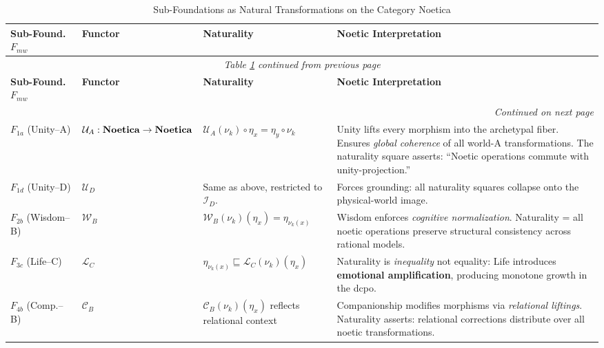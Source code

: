 \renewcommand{\arraystretch}{1.35}
\begin{longtable}{p{2cm}|p{2cm}|p{2.5cm}|p{4.5cm}}
\caption{Sub-Foundations as Natural Transformations on the Category Noetica}
\label{tab:subfoundation-natural-transformations} \\
\toprule
\textbf{Sub-Found.\ $F_{mw}$}
& \textbf{Functor}
& \textbf{Naturality}
& \textbf{Noetic Interpretation}
\\
\midrule
\endfirsthead
\multicolumn{4}{c}{\textit{Table \ref{tab:subfoundation-natural-transformations} continued from previous page}} \\
\toprule
\textbf{Sub-Found.\ $F_{mw}$}
& \textbf{Functor}
& \textbf{Naturality}
& \textbf{Noetic Interpretation}
\\
\midrule
\endhead
\midrule
\multicolumn{4}{r}{\textit{Continued on next page}} \\
\endfoot
\bottomrule
\endlastfoot

$F_{1a}$ (Unity--A)
& $\mathcal{U}_A : \mathbf{Noetica} \to \mathbf{Noetica}$
& $\mathcal{U}_A(\nu_k) \circ \eta_x = \eta_y \circ \nu_k$
& Unity lifts every morphism into the archetypal fiber.
  Ensures \emph{global coherence} of all world-A transformations.
  The naturality square asserts:
  ``Noetic operations commute with unity-projection.'' \\

$F_{1d}$ (Unity--D)
& $\mathcal{U}_D$
& Same as above, restricted to $\mathcal{I}_D$.
& Forces grounding: all naturality squares collapse onto the physical-world image.
\\

\midrule

$F_{2b}$ (Wisdom--B)
& $\mathcal{W}_B$
& $\mathcal{W}_B(\nu_k)(\eta_x) = \eta_{\nu_k(x)}$
& Wisdom enforces \emph{cognitive normalization}.
  Naturality = all noetic operations preserve structural consistency across rational models.
\\

\midrule

$F_{3c}$ (Life--C)
& $\mathcal{L}_C$
& $\eta_{\nu_k(x)} \sqsubseteq \mathcal{L}_C(\nu_k)(\eta_x)$
& Naturality is \emph{inequality} not equality:
  Life introduces \textbf{emotional amplification}, producing monotone growth in the dcpo.
\\

\midrule

$F_{4b}$ (Comp.--B)
& $\mathcal{C}_B$
& $\mathcal{C}_B(\nu_k)(\eta_x)$ reflects relational context
& Companionship modifies morphisms via \emph{relational liftings}.
  Naturality asserts: relational corrections distribute over all noetic transformations.
\\


\end{longtable}
